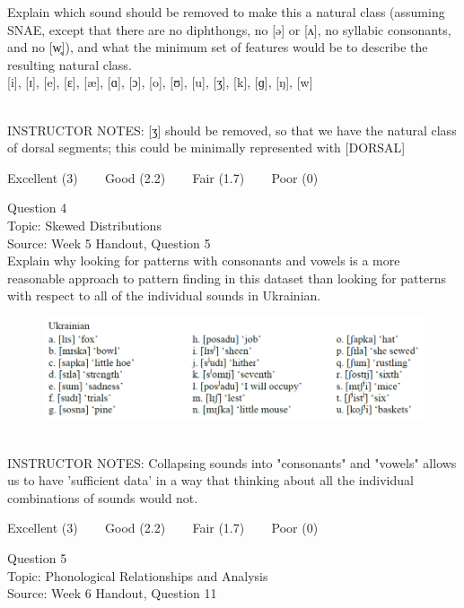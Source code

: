 \documentclass[12pt]{article}
\begin{document}
Explain which sound should be removed to make this a natural class (assuming SNAE, except that there are no diphthongs, no [ə] or [ʌ], no syllabic consonants, and no [w̥]), and what the minimum set of features would be to describe the resulting natural class.\\

{[i]}, {[ɪ]}, {[e]}, {[ɛ]}, {[æ]}, {[ɑ]}, {[ɔ]}, {[o]}, {[ʊ]}, {[u]}, {[ʒ]}, {[k]}, {[ɡ]}, {[ŋ]}, {[w]}


~\\
INSTRUCTOR NOTES: [ʒ] should be removed, so that we have the natural class of dorsal segments; this could be minimally represented with [DORSAL]


\vfill
Excellent (3) ~~~ Good (2.2) ~~~ Fair (1.7) ~~~ Poor (0)
\newpage

{\large Question 4}\\

Topic: Skewed Distributions\\
Source: Week 5 Handout, Question 5\\

Explain why looking for patterns with consonants and vowels is a more reasonable approach to pattern finding in this dataset than looking for patterns with respect to all of the individual sounds in Ukrainian.\\

\begin{figure}[H]
\includegraphics{../images/ukrainian.png}
\end{figure}

~\\
INSTRUCTOR NOTES: Collapsing sounds into "consonants" and "vowels" allows us to have 'sufficient data' in a way that thinking about all the individual combinations of sounds would not.


\vfill
Excellent (3) ~~~ Good (2.2) ~~~ Fair (1.7) ~~~ Poor (0)
\newpage

{\large Question 5}\\

Topic: Phonological Relationships and Analysis\\
Source: Week 6 Handout, Question 11\\
\end{document}
